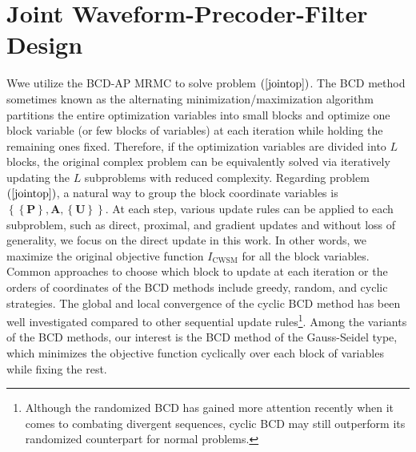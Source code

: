 \documentclass[9pt,journal]{IEEEtran}
\newcommand{\paren}[1]{\left({#1}\right)}
\newcommand{\braces}[1]{{\left\{ {#1}\right\}}}
\theoremstyle{definition}
\begin{document}
\section{Joint Waveform-Precoder-Filter Design}
\label{sec:solution}
Wwe utilize the BCD-AP MRMC to solve problem $\paren{\ref{jointop}}$. The BCD method sometimes known as the alternating minimization/maximization algorithm partitions the entire optimization variables into small blocks and optimize one block variable (or few blocks of variables) at
each iteration while holding the remaining ones fixed\cite{BlockCoordinate}. Therefore, if the optimization variables are divided into $L$ blocks, the original complex problem can be equivalently solved via iteratively updating the $L$ subproblems with reduced complexity. Regarding problem $\paren{\ref{jointop}}$, a natural way to group the block coordinate variables is $\braces{\braces{\mathbf{P}},\mathbf{A},\braces{\mathbf{U}}}$. At each step, various update rules can be applied to each subproblem, such as direct, proximal, and gradient updates\cite{BlockCoordinate} and without loss of generality, we focus on the direct update in this work. In other words, we maximize the original objective function $I_{\textrm{CWSM}}$ for all the block variables. Common approaches to choose which block to update at each iteration or the orders of coordinates of the BCD methods include greedy, random, and cyclic strategies. The  global and local convergence of the cyclic BCD method has been well investigated \cite{BCDconvergence,BlockCoordinate,Lops2019serveillance} 
compared to other sequential update rules\footnote{Although the randomized BCD has gained more attention recently when it comes to combating divergent sequences, cyclic BCD may still outperform its randomized counterpart for normal problems\cite{ADMMBCD}.}. Among the variants of the BCD methods, our interest is the BCD method of the Gauss-Seidel type, which minimizes the objective function cyclically over each block of variables while fixing the rest. 
\end{document}
